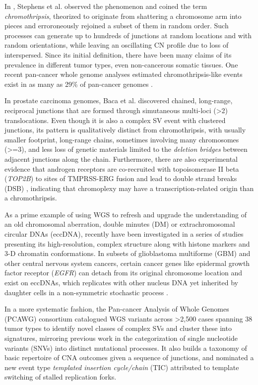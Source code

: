 \documentclass[phd,tocprelim]{cornell}
\begin{document}
In \cite{stephens2011}, Stephens et al. observed the phenomenon and coined the term \textit{chromothripsis}, theorized to originate from shattering a chromosome arm into pieces and erroroneously rejoined a subset of them in random order. Such processes can generate up to hundreds of junctions at random locations and with random orientations, while leaving an oscillating CN profile due to loss of interspersed. Since its initial definition, there have been many claims of its prevalence in different tumor types, even non-cancerous somatic tissues. One recent pan-cancer whole genome analyses estimated chromothripsis-like events exist in as many as 29\% of pan-cancer genomes \cite{Cortes-Ciriano2020-fx}.

In prostate carcinoma genomes, Baca et al. \cite{baca2013} discovered chained, long-range, reciprocal junctions that are formed through simutaneous multi-loci (>2) translocations. Even though it is also a complex SV event with clustered junctions, its pattern is qualitatively distinct from chromothripsis, with usually smaller footprint, long-range chains, sometimes involving many chromosomes (>=3), and less loss of genetic materials limited to the \textit{deletion bridges} between adjacent junctions along the chain. Furthermore, there are also experimental evidence that androgen receptors are co-recruited with topoisomerase II beta (\textit{TOP2B}) to sites of TMPRSS-ERG fusion and lead to double strand breaks (DSB) \cite{Haffner2010-cy}, indicating that chromoplexy may have a transcription-related origin than a chromothripsis.

As a prime example of using WGS to refresh and upgrade the understanding of an old chromosomal aberration, double minutes (DM) or extrachromosomal circular DNAs (eccDNA), recently have been investigated in a series of studies \cite{Helmsauer2020-do,Wu2019-ap,Kim2020-cu} presenting its high-resolution, complex structure along with histone markers and 3-D chromatin conformations. In subsets of glioblastoma multiforme (GBM) and other central nervous system cancers, certain cancer genes like epidermal growth factor receptor (\textit{EGFR}) can detach from its original chromosome location and exist on eccDNAs, which replicates with other nucleus DNA yet inherited by daughter cells in a non-symmetric stochastic process \cite{Gaubatz1990-da}. 

\newpage

In a more systematic fashion, the Pan-cancer Analysis of Whole Genomes (PCAWG) consortium catalogued WGS variants across >2,500 cases spanning 38 tumor types\cite{pcawg_marker2020-yi} to identify novel classes of complex SVs and cluster these into signatures, mirroring previous work in the categorization of single nucleotide variants (SNVs) into distinct mutational processes\cite{Li2020-ds,Alexandrov2013-zv,Nik-Zainal2012-dc,Menghi2018-er}. It also builds a taxonomy of basic repertoire of CNA outcomes given a sequence of junctions, and nominated a new event type \textit{templated insertion cycle/chain} (TIC) attributed to template switching of stalled replication forks.
\end{document}

